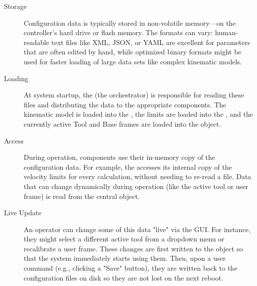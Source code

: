 \begin{description}
    \item[Storage] Configuration data is typically stored in non-volatile memory—on the controller's hard drive or flash memory. The formats can vary: human-readable text files like XML, JSON, or YAML are excellent for parameters that are often edited by hand, while optimized binary formats might be used for faster loading of large data sets like complex kinematic models.
    
    \item[Loading] At system startup, the \textbf{} (the orchestrator) is responsible for reading these files and distributing the data to the appropriate components. The kinematic model is loaded into the , the limits are loaded into the , and the currently active Tool and Base frames are loaded into the  object.
    
    \item[Access] During operation, components use their in-memory copy of the configuration data. For example, the  accesses its internal copy of the velocity limits for every calculation, without needing to re-read a file. Data that can change dynamically during operation (like the active tool or user frame) is read from the central  object.
    
    \item[Live Update] An operator can change some of this data "live" via the GUI. For instance, they might select a different active tool from a dropdown menu or recalibrate a user frame. These changes are first written to the  object so that the system immediately starts using them. Then, upon a user command (e.g., clicking a "Save" button), they are written back to the configuration files on disk so they are not lost on the next reboot.
\end{description}

